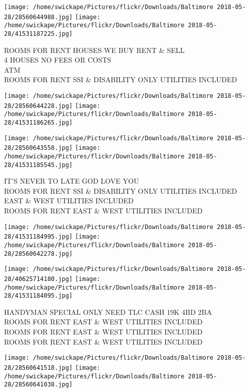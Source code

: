 \documentclass[10pt,letterpaper]{article}
\begin{document}
\texttt{[image: /home/swickape/Pictures/flickr/Downloads/Baltimore 2018-05-28/28560644988.jpg]}
\texttt{[image: /home/swickape/Pictures/flickr/Downloads/Baltimore 2018-05-28/41531187225.jpg]}

ROOMS FOR RENT HOUSES WE BUY RENT \& SELL\\
4 HOUSES NO FEES OR COSTS\\
ATM\\
ROOMS FOR RENT SSI \& DISABILITY ONLY UTILITIES INCLUDED
\pagebreak

\texttt{[image: /home/swickape/Pictures/flickr/Downloads/Baltimore 2018-05-28/28560644228.jpg]}
\texttt{[image: /home/swickape/Pictures/flickr/Downloads/Baltimore 2018-05-28/41531186265.jpg]}

\texttt{[image: /home/swickape/Pictures/flickr/Downloads/Baltimore 2018-05-28/28560643558.jpg]}
\texttt{[image: /home/swickape/Pictures/flickr/Downloads/Baltimore 2018-05-28/41531185545.jpg]}

IT'S NEVER TO LATE GOD LOVE YOU\\
ROOMS FOR RENT SSI \& DISABILITY ONLY UTILITIES INCLUDED\\
EAST \& WEST UTILITIES INCLUDED\\
ROOMS FOR RENT EAST \& WEST UTILITIES INCLUDED
\pagebreak

\texttt{[image: /home/swickape/Pictures/flickr/Downloads/Baltimore 2018-05-28/41531184995.jpg]}
\texttt{[image: /home/swickape/Pictures/flickr/Downloads/Baltimore 2018-05-28/28560642278.jpg]}

\texttt{[image: /home/swickape/Pictures/flickr/Downloads/Baltimore 2018-05-28/40625714180.jpg]}
\texttt{[image: /home/swickape/Pictures/flickr/Downloads/Baltimore 2018-05-28/41531184095.jpg]}

HANDYMAN SPECIAL ONLY NEED TLC CASH 19K 4BD 2BA\\
ROOMS FOR RENT EAST \& WEST UTILITIES INCLUDED\\
ROOMS FOR RENT EAST \& WEST UTILITIES INCLUDED\\
ROOMS FOR RENT EAST \& WEST UTILITIES INCLUDED
\pagebreak

\texttt{[image: /home/swickape/Pictures/flickr/Downloads/Baltimore 2018-05-28/28560641518.jpg]}
\texttt{[image: /home/swickape/Pictures/flickr/Downloads/Baltimore 2018-05-28/28560641038.jpg]}
\end{document}
